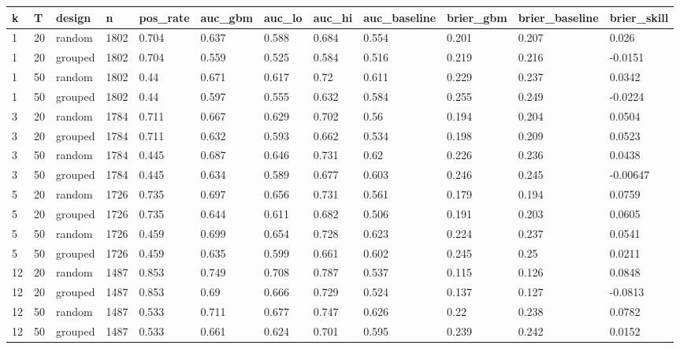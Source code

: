 \begin{tabular}{llllllllllll}
\toprule
k & T & design & n & pos\_rate & auc\_gbm & auc\_lo & auc\_hi & auc\_baseline & brier\_gbm & brier\_baseline & brier\_skill \\
\midrule
1 & 20 & random & 1802 & 0.704 & 0.637 & 0.588 & 0.684 & 0.554 & 0.201 & 0.207 & 0.026 \\
1 & 20 & grouped & 1802 & 0.704 & 0.559 & 0.525 & 0.584 & 0.516 & 0.219 & 0.216 & -0.0151 \\
1 & 50 & random & 1802 & 0.44 & 0.671 & 0.617 & 0.72 & 0.611 & 0.229 & 0.237 & 0.0342 \\
1 & 50 & grouped & 1802 & 0.44 & 0.597 & 0.555 & 0.632 & 0.584 & 0.255 & 0.249 & -0.0224 \\
3 & 20 & random & 1784 & 0.711 & 0.667 & 0.629 & 0.702 & 0.56 & 0.194 & 0.204 & 0.0504 \\
3 & 20 & grouped & 1784 & 0.711 & 0.632 & 0.593 & 0.662 & 0.534 & 0.198 & 0.209 & 0.0523 \\
3 & 50 & random & 1784 & 0.445 & 0.687 & 0.646 & 0.731 & 0.62 & 0.226 & 0.236 & 0.0438 \\
3 & 50 & grouped & 1784 & 0.445 & 0.634 & 0.589 & 0.677 & 0.603 & 0.246 & 0.245 & -0.00647 \\
5 & 20 & random & 1726 & 0.735 & 0.697 & 0.656 & 0.731 & 0.561 & 0.179 & 0.194 & 0.0759 \\
5 & 20 & grouped & 1726 & 0.735 & 0.644 & 0.611 & 0.682 & 0.506 & 0.191 & 0.203 & 0.0605 \\
5 & 50 & random & 1726 & 0.459 & 0.699 & 0.654 & 0.728 & 0.623 & 0.224 & 0.237 & 0.0541 \\
5 & 50 & grouped & 1726 & 0.459 & 0.635 & 0.599 & 0.661 & 0.602 & 0.245 & 0.25 & 0.0211 \\
12 & 20 & random & 1487 & 0.853 & 0.749 & 0.708 & 0.787 & 0.537 & 0.115 & 0.126 & 0.0848 \\
12 & 20 & grouped & 1487 & 0.853 & 0.69 & 0.666 & 0.729 & 0.524 & 0.137 & 0.127 & -0.0813 \\
12 & 50 & random & 1487 & 0.533 & 0.711 & 0.677 & 0.747 & 0.626 & 0.22 & 0.238 & 0.0782 \\
12 & 50 & grouped & 1487 & 0.533 & 0.661 & 0.624 & 0.701 & 0.595 & 0.239 & 0.242 & 0.0152 \\
\bottomrule
\end{tabular}